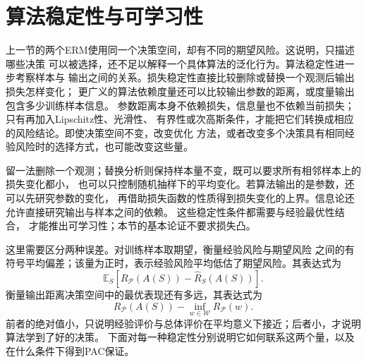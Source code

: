 \section{算法稳定性与可学习性}
\label{sec:algorithmic-stability}

上一节的两个ERM使用同一个决策空间，却有不同的期望风险。这说明，只描述哪些决策
可以被选择，还不足以解释一个具体算法的泛化行为。算法稳定性进一步考察样本与
输出之间的关系。损失稳定性直接比较删除或替换一个观测后输出损失怎样变化；
更广义的算法依赖度量还可以比较输出参数的距离，或度量输出包含多少训练样本信息。
参数距离本身不依赖损失，信息量也不依赖当前损失；只有再加入Lipschitz性、光滑性、
有界性或次高斯条件，才能把它们转换成相应的风险结论。即使决策空间不变，改变优化
方法，或者改变多个决策具有相同经验风险时的选择方式，也可能改变这些量。

留一法删除一个观测；替换分析则保持样本量不变，既可以要求所有相邻样本上的损失变化都小，
也可以只控制随机抽样下的平均变化。若算法输出的是参数，还可以先研究参数的变化，
再借助损失函数的性质得到损失变化的上界。信息论还允许直接研究输出与样本之间的依赖。
这些稳定性条件都需要与经验最优性结合，
才能推出可学习性；本节的基本论证不要求损失凸。

这里需要区分两种误差。对训练样本取期望，衡量经验风险与期望风险
之间的有符号平均偏差；该量为正时，表示经验风险平均低估了期望风险。其表达式为
\[
 \mathbb E_S[R_{\mathcal P}(A(S))-\hat R_S(A(S))].
\]
衡量输出距离决策空间中的最优表现还有多远，其表达式为
\[
 R_{\mathcal P}(A(S))-\inf_{w\in\mathcal W}R_{\mathcal P}(w).
\]
前者的绝对值小，只说明经验评价与总体评价在平均意义下接近；后者小，才说明算法学到了好的决策。
下面对每一种稳定性分别说明它如何联系这两个量，以及在什么条件下得到PAC保证。

